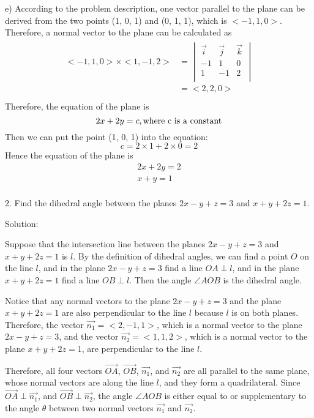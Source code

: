 \documentclass{article}
\begin{document}
e) According to the problem description, one vector parallel to the plane can be 
derived from the two points (1, 0, 1) and (0, 1, 1), which is $<-1, 1, 0>$. 
Therefore, a normal vector to the plane can be calculated as
\begin{gather*}
  \begin{split}
    <-1, 1, 0> \times <1, -1, 2> 
    &= \begin{vmatrix}
         \vec{i} & \vec{j} & \vec{k} \\
         -1 & 1 & 0 \\
         1 & -1 & 2 \\
       \end{vmatrix} \\
    &= <2, 2, 0> \\
  \end{split}
\end{gather*}
Therefore, the equation of the plane is 
\[ 2x + 2y = c, \textnormal{where c is a constant} \]
Then we can put the point (1, 0, 1) into the equation:
\[ c = 2 \times 1 + 2 \times 0 = 2 \]
Hence the equation of the plane is
\begin{gather*}
  2x + 2y = 2 \\
  x + y = 1 \\
\end{gather*}

2. Find the dihedral angle between the planes $2x - y + z = 3$ and 
$x + y + 2z = 1$.

Solution:

Suppose that the intersection line between the planes $2x - y + z = 3$ and 
$x + y + 2z = 1$ is $l$. By the definition of dihedral angles, we can find a 
point $O$ on the line $l$, and in the plane $2x - y + z = 3$ find a line 
$OA \perp l$, and in the plane $x + y + 2z = 1$ find a line $OB \perp l$. Then 
the angle $\angle{AOB}$ is the dihedral angle.

Notice that any normal vectors to the plane $2x - y + z = 3$ and the plane 
$x + y + 2z = 1$ are also perpendicular to the line $l$ because $l$ is on both 
planes. Therefore, the vector $\vec{n_1} = <2, -1, 1>$, which is a normal vector 
to the plane $2x - y + z = 3$, and the vector $\vec{n_2} = <1, 1, 2>$, which is 
a normal vector to the plane $x + y + 2z = 1$, are perpendicular to the line $l$.

Therefore, all four vectors $\vec{OA}$, $\vec{OB}$, $\vec{n_1}$, and $\vec{n_2}$ 
are all parallel to the same plane, whose normal vectors are along the line $l$, 
and they form a quadrilateral. Since $\vec{OA} \perp \vec{n_1}$, and 
$\vec{OB} \perp \vec{n_2}$, the angle $\angle{AOB}$ is either equal to or 
supplementary to the angle $\theta$ between two normal vectors $\vec{n_1}$ and 
$\vec{n_2}$.
\end{document}
